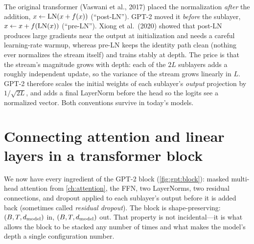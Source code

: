 \begin{deepdive}
The original transformer (Vaswani et al., 2017) placed the normalization \emph{after} the addition,
$x\leftarrow\operatorname{LN}(x+f(x))$ (``post-LN''). GPT-2 moved it \emph{before} the sublayer,
$x\leftarrow x+f(\operatorname{LN}(x))$ (``pre-LN''). Xiong et al.~(2020) showed that post-LN produces large
gradients near the output at initialization and needs a careful learning-rate warmup, whereas
pre-LN keeps the identity path clean (nothing ever normalizes the stream itself) and trains stably
at depth. The price is that the stream's magnitude grows with depth: each of the $2L$ sublayers adds
a roughly independent update, so the variance of the stream grows linearly in $L$. GPT-2 therefore
scales the initial weights of each sublayer's \emph{output} projection by $1/\sqrt{2L}$, and adds
a final LayerNorm before the head so the logits see a normalized vector. Both conventions survive
in today's models.
\end{deepdive}

\section{Connecting attention and linear layers in a transformer block}\label{sec:gpt:block}

We now have every ingredient of the GPT-2 block (\cref{fig:gpt:block}): masked multi-head
attention from \cref{ch:attention}, the FFN, two LayerNorms, two residual connections, and dropout
applied to each sublayer's output before it is added back (sometimes called \emph{residual
dropout}). The block is shape-preserving: $(B,T,d_{\text{model}})$ in, $(B,T,d_{\text{model}})$ out. That property is
not incidental---it is what allows the block to be stacked any number of times and what makes the
model's depth a single configuration number.


